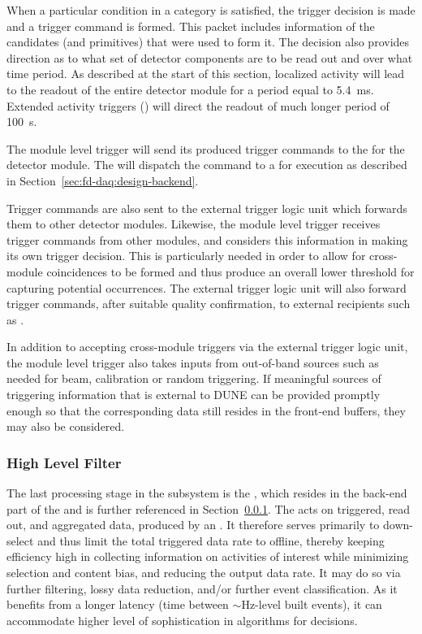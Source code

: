 When a particular condition in a category is satisfied, the trigger
decision is made and a trigger command is formed. 
This packet includes information of the candidates (and primitives)
that were used to form it. 
The decision also provides direction as to what set of detector components
are to be read out and over what time period.
As described at the start of this section, localized activity will lead
to the readout of the entire detector module for a period equal to \SI{5.4}{ms}.  Extended activity triggers () will
direct the readout of much longer period of \SI{100}{s}.

The module level trigger will send its produced trigger commands to the
 for the detector module.  The
 will dispatch the command to a  for
execution as described in Section~\ref{sec:fd-daq:design-backend}.

Trigger commands are also sent to the external trigger logic unit which
forwards them to other detector modules. Likewise, the module level
trigger receives trigger commands from other modules, and considers
this information in making its own trigger decision.
This is particularly needed in order to allow for cross-module
coincidences to be formed and thus produce an overall lower threshold for
capturing potential  occurrences. 
The external trigger logic unit will also forward  trigger
commands, after suitable quality confirmation, to external recipients
such as .

In addition to accepting cross-module triggers via the external trigger
logic unit, the module level trigger also takes inputs from out-of-band sources such as
needed for beam, calibration or random triggering. 
If meaningful sources of triggering information that is external to
DUNE can be provided promptly enough so that the corresponding data
still resides in the front-end buffers, they may also be considered.


\subsubsection{High Level Filter}
\label{sec:fd-daq:design-data-reduction}

The last processing stage in the  subsystem is the
, which resides in the back-end part of the  and
is further referenced in Section~\ref{sec:fd-daq:design-data-reduction}.
The  acts on triggered, read out, and aggregated data,
produced by an . 
It therefore serves primarily to down-select and thus
limit the total triggered data rate to offline, thereby keeping %
efficiency high in collecting information on activities of interest
while minimizing selection and content bias, and reducing the output data
rate. It may do so via 
further filtering, lossy data reduction, and/or further event
classification. As it benefits from a longer latency (time between
$\sim$Hz-level built events), it can accommodate higher level of
sophistication in algorithms for  decisions.

